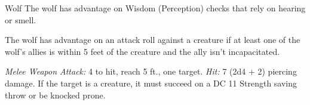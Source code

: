 \documentclass[10pt,a4paper,twoside,bg=print,twocolumn,openany,nodeprecatedcode]{dndbook}
\begin{document}
\begin{DndMonster}[float=t]{Wolf}
\DndMonsterBasics[
armor-class = {13 (natural armor)},
hit-points = {\DndDice{2d8 + 2}},
speed = {40 ft.}
]
\DndMonsterAbilityScores[
 str = 12,
 dex = 15,
 con = 12,
 int = 3,
 wis = 12,
 cha = 6
]
\DndMonsterDetails[
skills = {Perception +3, Stealth +4},
challenge = 1/4,
]
The wolf has advantage on Wisdom (Perception) checks that rely on hearing or smell.

The wolf has advantage on an attack roll against a creature if at least one of the wolf's allies is within 5 feet of the creature and the ally isn't incapacitated.

\textsl{Melee Weapon Attack:} 4 to hit, reach 5 ft., one target. \textsl{Hit:} 7 (2d4 + 2) piercing damage. If the target is a creature, it must succeed on a DC 11 Strength saving throw or be knocked prone.

\end{DndMonster}
\end{document}
